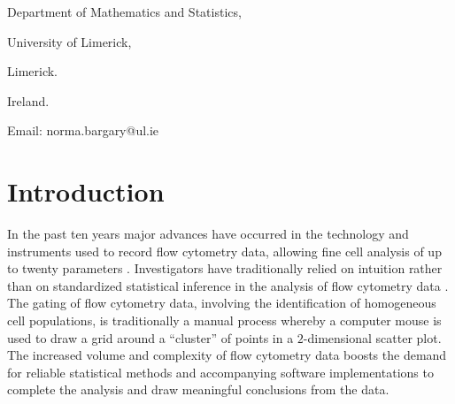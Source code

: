 \documentclass[a4paper, 12pt]{article}
\begin{document}
\medskip \medskip
\par \par {}
\par \par \noindent Department of Mathematics and Statistics,
\par \par \noindent University of Limerick,
\par \par \noindent Limerick.
\par \par \noindent Ireland.
\par \par \noindent Email: norma.bargary@ul.ie

\newpage
{}
\tableofcontents

\newpage
{}
\rhead{\rightmark}

\section{Introduction}

In the past ten years major advances have occurred in the technology and instruments used to record flow cytometry data, allowing fine cell analysis of up to twenty parameters \citep{derosa2003}. Investigators have traditionally relied on intuition rather than on standardized statistical inference in the analysis of flow cytometry data \citep{eudey1996}. The gating of flow cytometry data, involving the identification of homogeneous cell populations, is traditionally a manual process whereby a computer mouse is used to draw a grid around a ``cluster'' of points in a $2$-dimensional scatter plot. The increased volume and complexity of flow cytometry data boosts the demand for reliable statistical methods and accompanying software implementations to complete the analysis and draw meaningful conclusions from the data.

\medskip
\end{document}

